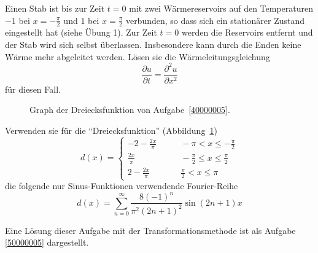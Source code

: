 Einen Stab ist bis zur Zeit $t=0$ mit zwei
Wärmereservoirs auf den Temperaturen $-1$ bei $x=-\frac{\pi}2$ und
$1$ bei $x=\frac{\pi}2$ verbunden,
so dass sich ein stationärer Zustand eingestellt hat (siehe
Übung 1). Zur Zeit $t=0$ werden die Reservoirs entfernt und der
Stab wird sich selbst überlassen. Insbesondere kann durch die
Enden keine Wärme mehr abgeleitet werden. Lösen sie die
Wärmeleitungsgleichung
\[
\frac{\partial u}{\partial t}=\frac{\partial^2 u}{\partial x^2}
\]
für diesen Fall.

\begin{hinweis}
\begin{figure}
\centering
{}
\caption{Graph der Dreiecksfunktion von Aufgabe~\ref{40000005}.
\label{40000005:dreieck}}
\end{figure}
Verwenden sie für die
``Dreiecksfunktion'' (Abbildung~\ref{40000005:dreieck})
\[
d(x)
=
\begin{cases}
\displaystyle-2-\frac{2x}{\pi}&\qquad -\pi<x\le \displaystyle-\frac{\pi}2\\
\displaystyle\frac{2x}{\pi}&\qquad \displaystyle-\frac{\pi}2\le x\le \frac{\pi}2\\
\displaystyle2-\frac{2x}{\pi}&\qquad \displaystyle \frac{\pi}2<x\le\pi
\end{cases}
\]
die folgende nur Sinus-Funktionen
verwendende Fourier-Reihe
\[
d(x)=\sum_{n=0}^\infty \frac{8(-1)^n}{\pi^2(2n+1)^2}\sin (2n+1)x
\]
\end{hinweis}

\begin{hinweis}
Eine Lösung dieser Aufgabe mit der Transformationsmethode ist als
Aufgabe \ref{50000005} dargestellt.
\end{hinweis}

